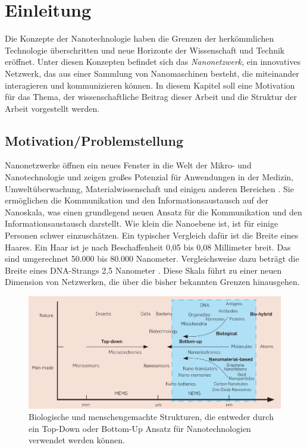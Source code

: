 \chapter{Einleitung}
\label{cha:einleitung}
Die Konzepte der Nanotechnologie haben die Grenzen der herkömmlichen Technologie überschritten und neue Horizonte der Wissenschaft und Technik eröffnet. Unter diesen Konzepten befindet sich das \emph{Nanonetzwerk}, ein innovatives Netzwerk, das aus einer Sammlung von Nanomaschinen besteht, die miteinander interagieren und kommunizieren können. In diesem Kapitel soll eine Motivation für das Thema, der wissenschaftliche Beitrag dieser Arbeit und die Struktur der Arbeit vorgestellt werden.

\section{Motivation/Problemstellung}

Nanonetzwerke öffnen ein neues Fenster in die Welt der Mikro- und Nanotechnologie und zeigen großes Potenzial für Anwendungen in der Medizin, Umweltüberwachung, Materialwissenschaft und einigen anderen Bereichen \cite{akyildiz2011nano}. Sie ermöglichen die Kommunikation und den Informationsaustausch auf der Nanoskala, was einen grundlegend neuen Ansatz für die Kommunikation und den Informationsaustausch darstellt. Wie klein die Nanoebene ist, ist für einige Personen schwer einzuschätzen. Ein typischer Vergleich dafür ist die Breite eines Haares. Ein Haar ist je nach Beschaffenheit 0,05 bis 0,08 Millimeter breit. Das sind umgerechnet 50.000 bis 80.000 Nanometer. Vergleichsweise dazu beträgt die Breite eines DNA-Strangs 2,5 Nanometer \cite{wiki2023haar, wiki2023dna}. Diese Skala führt zu einer neuen Dimension von Netzwerken, die über die bisher bekannten Grenzen hinausgehen.

\begin{figure}
	\includegraphics[width=\textwidth]{images/nanomachines.png}
	\caption[Nanotechnologien Unterscheidungen]{Biologische und menschengemachte Strukturen, die entweder durch ein Top-Down oder Bottom-Up Ansatz für Nanotechnologien verwendet werden können.\cite{akyildiz2011nano}}
	\label{fig:nanomachines}
\end{figure}

